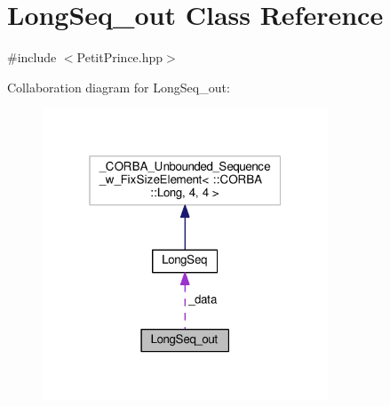 \hypertarget{class_long_seq__out}{}\section{Long\+Seq\+\_\+out Class Reference}
\label{class_long_seq__out}


{\ttfamily \#include $<$Petit\+Prince.\+hpp$>$}



Collaboration diagram for Long\+Seq\+\_\+out\+:
\nopagebreak
\begin{figure}[H]
\begin{center}
\leavevmode
\includegraphics[width=241pt]{class_long_seq__out__coll__graph}
\end{center}
\end{figure}
